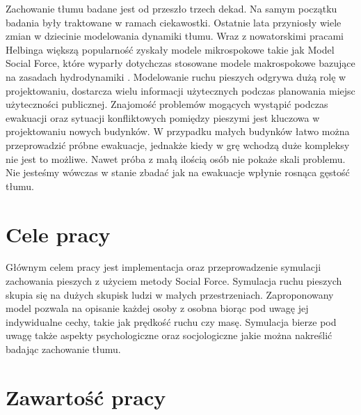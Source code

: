 Zachowanie tłumu badane jest od przeszło trzech dekad. Na samym początku badania były traktowane w ramach ciekawostki. Ostatnie lata przyniosły wiele zmian w dziecinie modelowania dynamiki tłumu. Wraz z nowatorskimi pracami Helbinga\cite{SforceModelForPedDyn} większą popularność zyskały modele mikrospokowe takie jak Model Social Force, które wyparły dotychczas stosowane modele makrospokowe bazujące na zasadach hydrodynamiki  \cite{SforceModelForPedDyn}. Modelowanie ruchu pieszych odgrywa dużą rolę w projektowaniu, dostarcza wielu informacji użytecznych podczas planowania miejsc użyteczności publicznej. Znajomość problemów mogących wystąpić podczas ewakuacji oraz sytuacji konfliktowych pomiędzy pieszymi jest kluczowa w projektowaniu nowych budynków. W przypadku małych budynków łatwo można przeprowadzić próbne ewakuacje, jednakże kiedy w grę wchodzą duże kompleksy nie jest to możliwe. Nawet próba z małą ilością osób nie pokaże skali problemu. Nie jesteśmy wówczas w stanie zbadać jak na ewakuacje wpłynie rosnąca gęstość tłumu.



\section{Cele pracy}
\label{sec:celePracy}

Głównym celem pracy jest implementacja oraz przeprowadzenie symulacji zachowania pieszych z użyciem metody Social Force. Symulacja ruchu pieszych skupia się na dużych skupisk ludzi w małych przestrzeniach. Zaproponowany model pozwala na opisanie każdej osoby z osobna biorąc pod uwagę jej indywidualne cechy, takie jak prędkość ruchu czy masę. Symulacja bierze pod uwagę także aspekty psychologiczne oraz socjologiczne jakie można nakreślić badając zachowanie tłumu.


\section{Zawartość pracy}
\label{sec:zawartoscPracy}

